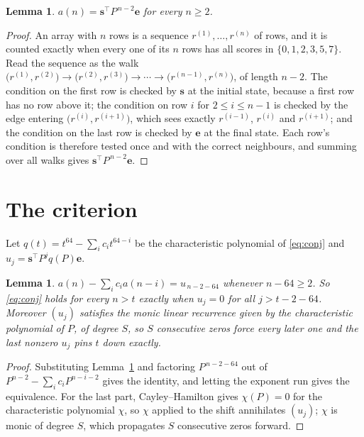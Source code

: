 \documentclass[11pt,a4paper]{article}
\theoremstyle{plain}
\newtheorem{lemma}[theorem]{Lemma}
\theoremstyle{definition}
\begin{document}
\begin{lemma}\label{lem:walk}
$a(n)=\mathbf{s}^{\!\top}P^{\,n-2}\mathbf{e}$ for every $n\ge2$.
\end{lemma}

\begin{proof}
An array with $n$ rows is a sequence $r^{(1)},\dots,r^{(n)}$ of rows, and it is counted
exactly when every one of its $n$ rows has all scores in $\{0,1,2,3,5,7\}$. Read the sequence as the
walk $\bigl(r^{(1)},r^{(2)}\bigr)\to\bigl(r^{(2)},r^{(3)}\bigr)\to\cdots\to
\bigl(r^{(n-1)},r^{(n)}\bigr)$, of length $n-2$. The condition on the first row is
checked by $\mathbf{s}$ at the initial state, because a first row has no row above it; the
condition on row $i$ for $2\le i\le n-1$ is checked by the edge entering
$\bigl(r^{(i)},r^{(i+1)}\bigr)$, which sees exactly $r^{(i-1)}$, $r^{(i)}$ and
$r^{(i+1)}$; and the condition on the last row is checked by $\mathbf{e}$ at the final
state. Each row's condition is therefore tested once and with the correct neighbours, and
summing over all walks gives $\mathbf{s}^{\!\top}P^{\,n-2}\mathbf{e}$.
\end{proof}

\section{The criterion}

Let $q(t)=t^{64}-\sum_i c_i t^{64-i}$ be the characteristic polynomial of
\eqref{eq:conj} and $u_j=\mathbf{s}^{\!\top}P^{j}q(P)\mathbf{e}$.

\begin{lemma}\label{lem:crit}
$a(n)-\sum_i c_i a(n-i)=u_{\,n-2-64}$ whenever $n-64\ge2$. So \eqref{eq:conj}
holds for every $n>t$ exactly when $u_j=0$ for all $j>t-2-64$. Moreover $(u_j)$
satisfies the monic linear recurrence given by the characteristic polynomial of $P$, of
degree $S$, so $S$ consecutive zeros force every later one and the last nonzero $u_j$ pins
$t$ down exactly.
\end{lemma}

\begin{proof}
Substituting Lemma~\ref{lem:walk} and factoring $P^{\,n-2-64}$ out of
$P^{n-2}-\sum_i c_i P^{n-i-2}$ gives the identity, and letting the exponent run gives the
equivalence. For the last part, Cayley--Hamilton gives $\chi(P)=0$ for the characteristic
polynomial $\chi$, so $\chi$ applied to the shift annihilates $(u_j)$; $\chi$ is monic of
degree $S$, which propagates $S$ consecutive zeros forward.
\end{proof}
\end{document}
